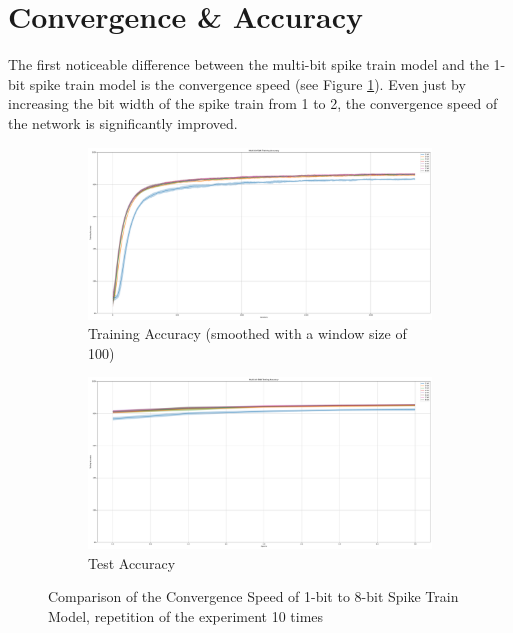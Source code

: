     \section{Convergence \& Accuracy}
    \label{sec:convergence_accuracy}
        The first noticeable difference between the multi-bit spike train model and the 1-bit spike train model is the convergence speed (see Figure \ref{fig:convergence_speed}). Even just by increasing the bit width of the spike train from 1 to 2, the convergence speed of the network is significantly improved. 
        \begin{figure}[!htpb]
            \centering
            \begin{subfigure}[H]{\textwidth}
                \centering
                \includegraphics[width=\textwidth]{../standard/FashionMNIST/plots/fashionmnist_train_acc.pdf}
                \caption{Training Accuracy (smoothed with a window size of 100)}
            \end{subfigure}
            \hfill
            \begin{subfigure}[H]{\textwidth}
                \centering
                \includegraphics[width=\textwidth]{../standard/FashionMNIST/plots/fashionmnist_test_acc.pdf}
                \caption{Test Accuracy}
            \end{subfigure}
            \caption{Comparison of the Convergence Speed of 1-bit to 8-bit Spike Train Model, repetition of the experiment 10 times}
            \label{fig:convergence_speed}
        \end{figure}

